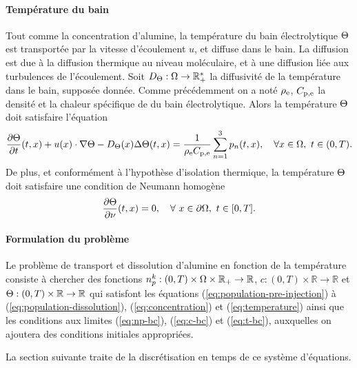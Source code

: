 \paragraph{Température du bain}
Tout comme la concentration d'alumine, la température du bain
électrolytique $\Theta$ est transportée par la vitesse
d'écoulement $u$, et diffuse dans le bain. La diffusion est due à la
diffusion thermique au niveau moléculaire, et à une diffusion liée aux
turbulences de l'écoulement. Soit $D_\Theta:\Omega\to\mathbb
R^*_+$ la diffusivité de la température dans le bain, supposée
donnée. Comme précédemment on a noté $\rho_\mathrm{e}$,
$C_{\mathrm{p,e}}$ la densité et la chaleur spécifique de du bain
électrolytique. Alors la température $\Theta$ doit satisfaire l'équation
\begin{equation}\label{eq:temperature}
\frac{\partial \Theta}{\partial t}(t, x) +
u(x)\cdot\nabla\Theta - D_\Theta(x)\Delta
\Theta(t, x) =
\frac{1}{\rho_\mathrm{e}C_{\mathrm{p,e}}}\sum_{n = 1}^{3}p_n(t, x),
\quad \forall x\in\Omega,\ t\in(0, T).
\end{equation}
De plus, et conformément à l'hypothèse d'isolation thermique, la température
$\Theta$ doit satisfaire une condition de Neumann homogène
\begin{equation}\label{eq:t-bc}
  \frac{\partial \Theta}{\partial \nu}(t, x) = 0, \quad
  \forall\ x\in\partial \Omega,\ t\in[0, T].
\end{equation}

\paragraph{Formulation du problème}
Le problème de transport et dissolution d'alumine en fonction de la
température consiste à chercher des fonctions $n_p^k:(0,
T)\times\Omega\times\mathbb R_+\to \mathbb R$, $c:(0, T)\times\mathbb R\to
\mathbb R$ et $\Theta:(0, T)\times\mathbb R\to\mathbb R$ qui
satisfont les équations (\ref{eq:population-pre-injection}) à
(\ref{eq:population-dissolution}), (\ref{eq:concentration}) et
(\ref{eq:temperature}) ainsi que les conditions aux limites
(\ref{eq:np-bc}), (\ref{eq:c-bc}) et (\ref{eq:t-bc}), auxquelles on
ajoutera des conditions initiales appropriées.

La section suivante traite de la discrétisation en temps de ce
système d'équations.
